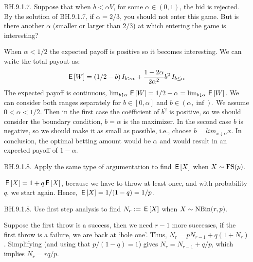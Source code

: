 \begin{exercise}
  BH.9.1.7. Suppose that when $b<\alpha V$, for some $\alpha\in(0,1)$, the bid is rejected.
By the solution of BH.9.1.7, if $\alpha=2/3$, you should not enter this game.
But is there another $\alpha$ (smaller or larger than $2/3$) at which entering the game is interesting?
\begin{solution}
  When $\alpha < 1/2$ the expected payoff is positive so it becomes interesting. We can write the total payout as:
 \begin{align*}
   \,\mathsf{E}\left[W\right] &= (1/2 - b) \,I_{b>\alpha} + \frac{1-2\alpha}{2\alpha^2}b^2 \,I_{b\leq \alpha} \\
  \end{align*}
  The expected payoff is continuous, $\lim_{b\uparrow \alpha} \,\mathsf{E}\left[W\right]  = 1/2 - \alpha = \lim_{b\downarrow \alpha} \,\mathsf{E}\left[W\right]$. We can consider both ranges separately for $b \in [0,\alpha]$ and $b \in (\alpha, \inf)$. We assume $0<\alpha<1/2$. Then in the first case the co\"efficient of $b^2$ is positive, so we should consider the boundary condition, $b=\alpha$ is the maximizer. In the second case $b$ is negative, so we should make it as small as possible, i.e., choose $b = lim_{x \downarrow \alpha} x$. In conclusion, the optimal betting amount would be $\alpha$ and would result in an expected payoff of $1-\alpha$. 
\end{solution}
\end{exercise}

\begin{exercise}
BH.9.1.8. Apply the same type of argumentation to find $\,\mathsf{E}\left[X\right]$ when $X\sim \mathrm{FS}(p)$.
\begin{hint}
\end{hint}
\begin{solution}
$\,\mathsf{E}\left[X\right] = 1 + q\,\mathsf{E}\left[X\right]$, because we have to throw at least once, and with probability $q$, we start again. Hence, $\,\mathsf{E}\left[X\right] = 1/(1-q) = 1/p$.
\end{solution}
\end{exercise}

\begin{exercise}
BH.9.1.8. Use first step analysis to  find $N_{r} := \,\mathsf{E}\left[X\right]$ when $X\sim \mathrm{NBin}(r,p)$.
\begin{solution}
Suppose the first throw is a success, then we need $r-1$ more successes, if the first throw is a failure, we are back at `hole one'. Thus, $N_{r} = p N_{r-1}+q(1+N_{r})$. Simplifying (and using that $p/(1-q)=1$) gives $N_{r} = N_{r-1} + q/p$, which implies $N_{r} = r q/p$.
\end{solution}
\end{exercise}

